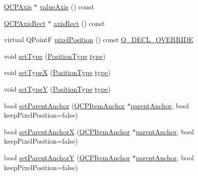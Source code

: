 \begin{DoxyCompactItemize}
\item 
\hyperlink{class_q_c_p_axis}{Q\+C\+P\+Axis} $\ast$ \hyperlink{class_q_c_p_item_position_a356ac94e7e73d88deb7f2841c0d0c734}{value\+Axis} () const
\item 
\hyperlink{class_q_c_p_axis_rect}{Q\+C\+P\+Axis\+Rect} $\ast$ \hyperlink{class_q_c_p_item_position_ae4081cfe7575f922f403c6e3a2ce7891}{axis\+Rect} () const
\item 
virtual Q\+PointF \hyperlink{class_q_c_p_item_position_a8be9a4787635433edecc75164beb748d}{pixel\+Position} () const \hyperlink{qcustomplot_8h_a42cc5eaeb25b85f8b52d2a4b94c56f55}{Q\+\_\+\+D\+E\+C\+L\+\_\+\+O\+V\+E\+R\+R\+I\+DE}
\item 
void \hyperlink{class_q_c_p_item_position_aa476abf71ed8fa4c537457ebb1a754ad}{set\+Type} (\hyperlink{class_q_c_p_item_position_aad9936c22bf43e3d358552f6e86dbdc8}{Position\+Type} \hyperlink{class_q_c_p_item_position_abfd74d86bd799306ce0295ffe433bdfc}{type})
\item 
void \hyperlink{class_q_c_p_item_position_a2113b2351d6d00457fb3559a4e20c3ea}{set\+TypeX} (\hyperlink{class_q_c_p_item_position_aad9936c22bf43e3d358552f6e86dbdc8}{Position\+Type} \hyperlink{class_q_c_p_item_position_abfd74d86bd799306ce0295ffe433bdfc}{type})
\item 
void \hyperlink{class_q_c_p_item_position_ac2a454aa5a54c1615c50686601ec4510}{set\+TypeY} (\hyperlink{class_q_c_p_item_position_aad9936c22bf43e3d358552f6e86dbdc8}{Position\+Type} \hyperlink{class_q_c_p_item_position_abfd74d86bd799306ce0295ffe433bdfc}{type})
\item 
bool \hyperlink{class_q_c_p_item_position_ac094d67a95d2dceafa0d50b9db3a7e51}{set\+Parent\+Anchor} (\hyperlink{class_q_c_p_item_anchor}{Q\+C\+P\+Item\+Anchor} $\ast$\hyperlink{class_q_c_p_item_position_a0a87f9dce1af6cc9b510785991bcf1c6}{parent\+Anchor}, bool keep\+Pixel\+Position=false)
\item 
bool \hyperlink{class_q_c_p_item_position_add71461a973927c74e42179480916d9c}{set\+Parent\+AnchorX} (\hyperlink{class_q_c_p_item_anchor}{Q\+C\+P\+Item\+Anchor} $\ast$\hyperlink{class_q_c_p_item_position_a0a87f9dce1af6cc9b510785991bcf1c6}{parent\+Anchor}, bool keep\+Pixel\+Position=false)
\item 
bool \hyperlink{class_q_c_p_item_position_add5ec1db9d19cec58a3b5c9e0a0c3f9d}{set\+Parent\+AnchorY} (\hyperlink{class_q_c_p_item_anchor}{Q\+C\+P\+Item\+Anchor} $\ast$\hyperlink{class_q_c_p_item_position_a0a87f9dce1af6cc9b510785991bcf1c6}{parent\+Anchor}, bool keep\+Pixel\+Position=false)
\item 

\end{DoxyCompactItemize}
